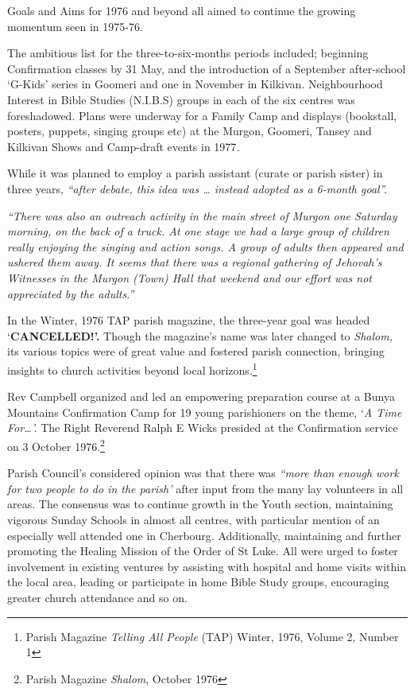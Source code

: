 Goals and Aims for 1976 and beyond all aimed to continue the growing momentum seen in 1975-76.



The ambitious list for the three-to-six-months periods included; beginning Confirmation classes by 31 May, and the introduction of a September after-school `G-Kids' series in Goomeri and one in November in Kilkivan. Neighbourhood Interest in Bible Studies (N.I.B.S) groups in each of the six centres was foreshadowed. Plans were underway for a Family Camp and displays (bookstall, posters, puppets, singing groups etc) at the Murgon, Goomeri, Tansey and Kilkivan Shows and Camp-draft events in 1977\emph{.}



While it was planned to employ a parish assistant (curate or parish sister) in three years, \emph{``after debate, this idea was \ldots{} instead adopted as a 6-month goal''.}



\emph{``There was also an outreach activity in the main street of Murgon one Saturday morning, on the back of a truck. At one stage we had a large group of children really enjoying the singing and action songs. A group of adults then appeared and ushered them away. It seems that there was a regional gathering of Jehovah's Witnesses in the Murgon (Town) Hall that weekend and our effort was not appreciated by the adults.''}



In the Winter, 1976 TAP parish magazine, the three-year goal was headed `\textbf{CANCELLED!'.} Though the magazine's name was later changed to \emph{Shalom,} its various topics were of great value and fostered parish connection, bringing insights to church activities beyond local horizons.\footnote{Parish Magazine \emph{Telling All People} (TAP) Winter, 1976, Volume 2, Number 1}


Rev Campbell organized and led an empowering preparation course at a Bunya Mountains Confirmation Camp for 19 young parishioners on the theme, `\emph{A Time For\ldots'.} The Right Reverend Ralph E Wicks presided at the Confirmation service on 3 October 1976.\footnote{Parish Magazine \emph{Shalom}, October 1976}


Parish Council's considered opinion was that there was \emph{``more than enough work for two people to do in the parish'} after input from the many lay volunteers in all areas. The consensus was to continue growth in the Youth section, maintaining vigorous Sunday Schools in almost all centres, with particular mention of an especially well attended one in Cherbourg. Additionally, maintaining and further promoting the Healing Mission of the Order of St Luke. All were urged to foster involvement in existing ventures by assisting with hospital and home visits within the local area, leading or participate in home Bible Study groups, encouraging greater church attendance and so on.



